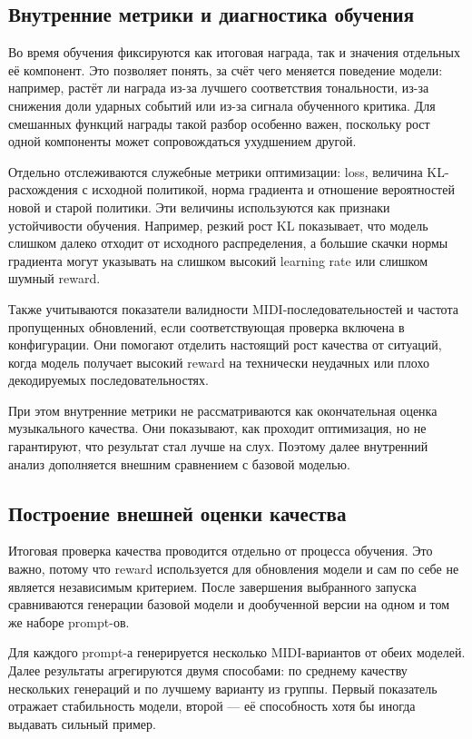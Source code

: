 \documentclass[a4paper,12pt]{extarticle}
\begin{document}
\subsection{Внутренние метрики и диагностика обучения}

Во время обучения фиксируются как итоговая награда, так и значения отдельных
её компонент. Это позволяет понять, за счёт чего меняется поведение модели:
например, растёт ли награда из-за лучшего соответствия тональности, из-за
снижения доли ударных событий или из-за сигнала обученного критика. Для
смешанных функций награды такой разбор особенно важен, поскольку рост одной
компоненты может сопровождаться ухудшением другой.

Отдельно отслеживаются служебные метрики оптимизации: loss, величина
KL-расхождения с исходной политикой, норма градиента и отношение вероятностей
новой и старой политики. Эти величины используются как признаки устойчивости
обучения. Например, резкий рост KL показывает, что модель слишком далеко
отходит от исходного распределения, а большие скачки нормы градиента могут
указывать на слишком высокий learning rate или слишком шумный reward.

Также учитываются показатели валидности MIDI-последовательностей и частота
пропущенных обновлений, если соответствующая проверка включена в конфигурации.
Они помогают отделить настоящий рост качества от ситуаций, когда модель
получает высокий reward на технически неудачных или плохо декодируемых
последовательностях.

При этом внутренние метрики не рассматриваются как окончательная оценка
музыкального качества. Они показывают, как проходит оптимизация, но не
гарантируют, что результат стал лучше на слух. Поэтому далее внутренний анализ
дополняется внешним сравнением с базовой моделью.

\subsection{Построение внешней оценки качества}

Итоговая проверка качества проводится отдельно от процесса обучения. Это
важно, потому что reward используется для обновления модели и сам по себе не
является независимым критерием. После завершения выбранного запуска
сравниваются генерации базовой модели и дообученной версии на одном и том же
наборе prompt-ов.

Для каждого prompt-а генерируется несколько MIDI-вариантов от обеих моделей.
Далее результаты агрегируются двумя способами: по среднему качеству нескольких
генераций и по лучшему варианту из группы. Первый показатель отражает
стабильность модели, второй --- её способность хотя бы иногда выдавать сильный
пример.
\end{document}
